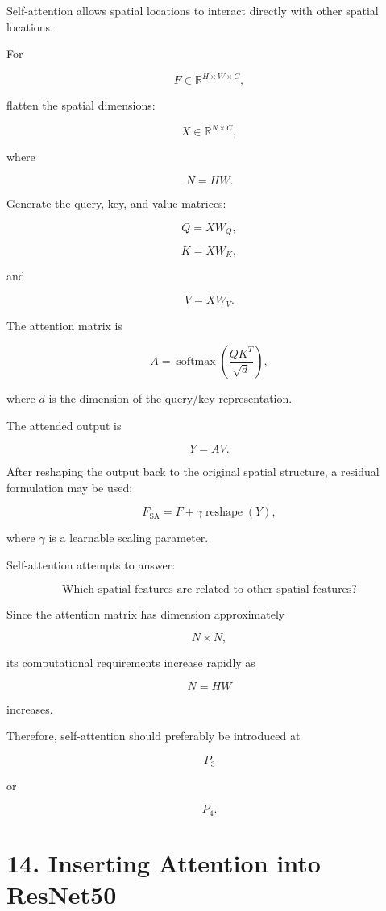\documentclass[10pt]{article}
\begin{document}
Self-attention allows spatial locations to interact directly with other
spatial locations.

For

\[
F\in\mathbb{R}^{H\times W\times C},
\]

flatten the spatial dimensions:

\[
X\in\mathbb{R}^{N\times C},
\]

where

\[
N=HW.
\]

Generate the query, key, and value matrices:

\[
Q=XW_Q,
\]

\[
K=XW_K,
\]

and

\[
V=XW_V.
\]

The attention matrix is

\[
A
=
\operatorname{softmax}
\left(
\frac{QK^T}{\sqrt{d}}
\right),
\]

where $d$ is the dimension of the query/key representation.

The attended output is

\[
Y=AV.
\]

After reshaping the output back to the original spatial structure, a residual
formulation may be used:

\[
F_{\mathrm{SA}}
=
F
+
\gamma
\operatorname{reshape}(Y),
\]

where $\gamma$ is a learnable scaling parameter.

Self-attention attempts to answer:

\[
\boxed{
\text{Which spatial features are related to other spatial features?}
}
\]

Since the attention matrix has dimension approximately

\[
N\times N,
\]

its computational requirements increase rapidly as

\[
N=HW
\]

increases.

Therefore, self-attention should preferably be introduced at

\[
P_3
\]

or

\[
P_4.
\]

\section*{14. Inserting Attention into ResNet50}
\end{document}
